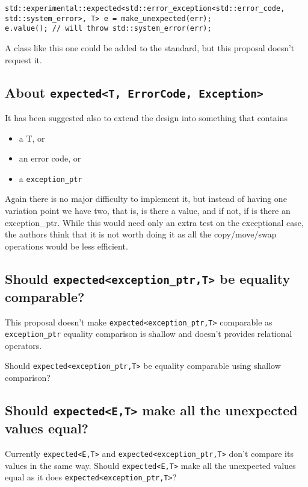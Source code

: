 \documentclass[a4paper,10pt]{article}
\newcommand{\cpp}[1]{\lstinline{#1}}
\begin{document}
\begin{lstlisting}
std::experimental::expected<std::error_exception<std::error_code, std::system_error>, T> e = make_unexpected(err);
e.value(); // will throw std::system_error(err);
\end{lstlisting}

A class like this one could be added to the standard, but this proposal doesn't request it. 

\subsection{About \cpp{expected<T, ErrorCode, Exception>}}

It has been suggested also to extend the design into something that contains 

\begin{itemize}
\item a T, or
\item an error code, or
\item a \cpp{exception_ptr} 
\end{itemize}

Again there is no major difficulty to implement it, but instead of having one variation point we have two, that is, is there a value, and if not, if is there an exception_ptr. While this would need only an extra test on the exceptional case, the authors think that it is not worth doing it as all the copy/move/swap operations would be less efficient. 

\subsection{Should \cpp{expected<exception_ptr,T>} be equality comparable?}

This proposal doesn't make \cpp{expected<exception_ptr,T>} comparable as \cpp{exception_ptr} equality comparison is shallow and doesn't provides relational operators.

Should \cpp{expected<exception_ptr,T>} be equality comparable using shallow comparison?

\subsection{Should \cpp{expected<E,T>} make all the unexpected values equal?}

Currently \cpp{expected<E,T>} and \cpp{expected<exception_ptr,T>} don't compare its values in the same way.
Should \cpp{expected<E,T>} make all the unexpected values equal as it does \cpp{expected<exception_ptr,T>}?
\end{document}
